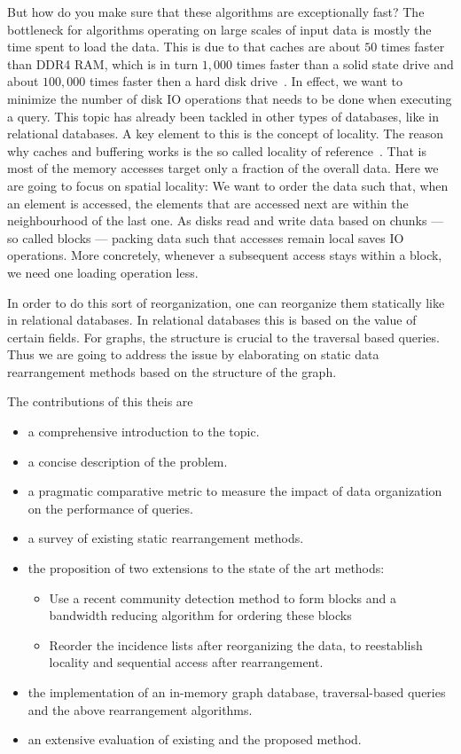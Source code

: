 But how do you make sure that these algorithms are exceptionally fast?
The bottleneck for algorithms operating on large scales of input data is mostly the time spent to load the data. 
This is due to that caches are about $50$ times faster than DDR4 RAM, which is in turn $1,000$ times faster than a solid state drive and about $100,000$ times faster then a hard disk drive~\autocite{mem-h}.
In effect, we want to minimize the number of disk IO operations that needs to be done when executing a query.
This topic has already been tackled in other types of databases, like in relational databases.
A key element to this is the concept of locality. 
The reason why caches and buffering works is the so called locality of reference~\autocite{tanenbaum2015modern, jacob2010memory}. 
That is most of the memory accesses target only a fraction of the overall data. 
Here we are going to focus on spatial locality: 
We want to order the data such that, when an element is accessed, the elements that are accessed next are within the neighbourhood of the last one. 
As disks read and write data based on chunks --- so called blocks --- packing data such that accesses remain local saves IO operations. More concretely, whenever a subsequent access stays within a block, we need one loading operation less.

In order to do this sort of reorganization, one can reorganize them statically like in relational databases. 
In relational databases this is based on the value of certain fields.
For graphs, the structure is crucial to the traversal based queries.
Thus we are going to address the issue by elaborating on static data rearrangement  methods based on the structure of the graph.

The contributions of this theis are 
\begin{itemize}
 \item a comprehensive introduction to the topic.
 \item a concise description of the problem.
 \item a pragmatic comparative metric to measure the impact of data organization on the performance of queries.
 \item a survey of existing static rearrangement methods.
 \item the proposition of two extensions to the state of the art methods:
 \begin{itemize}
  \item Use a recent community detection method to form blocks and a bandwidth reducing algorithm for ordering these blocks
  \item Reorder the incidence lists after reorganizing the data, to reestablish locality and sequential access after rearrangement.
 \end{itemize}

 \item the implementation of an in-memory graph database, traversal-based queries and the above rearrangement algorithms.
 \item an extensive evaluation of existing and the proposed method.
\end{itemize}

